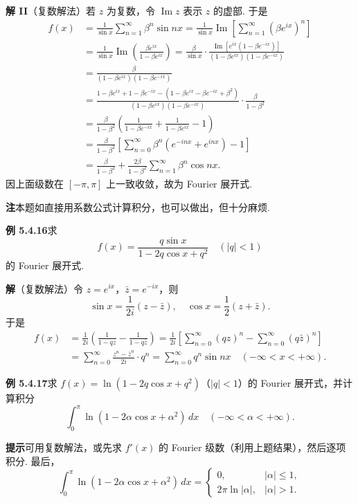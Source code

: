 \documentclass[UTF8, 12pt, fontset=fandol, oneside]{ctexart}
\begin{document}
\noindent\textbf{解 II}\quad （复数解法）若 $z$ 为复数，令 $\operatorname{Im}z$ 表示 $z$ 的虚部. 于是
\[
\begin{aligned}
f(x)&=\frac1{\sin x}\sum_{n=1}^{\infty}\beta^n\sin nx
=\frac1{\sin x}\operatorname{Im}\left[\sum_{n=1}^{\infty}(\beta e^{ix})^n\right]\\
&=\frac1{\sin x}\operatorname{Im}\left(\frac{\beta e^{ix}}{1-\beta e^{ix}}\right)
=\frac{\beta}{\sin x}\cdot
\frac{\operatorname{Im}[e^{ix}(1-\beta e^{-ix})]}
{(1-\beta e^{ix})(1-\beta e^{-ix})}\\
&=\frac{\beta}{(1-\beta e^{ix})(1-\beta e^{-ix})}\\
&=\frac{1-\beta e^{ix}+1-\beta e^{-ix}-(1-\beta e^{ix}-\beta e^{-ix}+\beta^2)}
{(1-\beta e^{ix})(1-\beta e^{-ix})}\cdot\frac{\beta}{1-\beta^2}\\
&=\frac{\beta}{1-\beta^2}\left(\frac1{1-\beta e^{-ix}}+\frac1{1-\beta e^{ix}}-1\right)\\
&=\frac{\beta}{1-\beta^2}\left[\sum_{n=0}^{\infty}\beta^n(e^{-inx}+e^{inx})-1\right]\\
&=\frac{\beta}{1-\beta^2}+\frac{2\beta}{1-\beta^2}\sum_{n=1}^{\infty}\beta^n\cos nx.
\end{aligned}
\]
因上面级数在 $[-\pi,\pi]$ 上一致收敛，故为 Fourier 展开式.

\noindent\textbf{注}\quad 本题如直接用系数公式计算积分，也可以做出，但十分麻烦.

\noindent\textbf{例 5.4.16}\quad 求
\[
  f(x)=\frac{q\sin x}{1-2q\cos x+q^2}\quad(|q|<1)
\]
的 Fourier 展开式.

\noindent\textbf{解}\quad （复数解法）令 $z=e^{ix}$，$\bar z=e^{-ix}$，则
\[
  \sin x=\frac1{2i}(z-\bar z),\quad \cos x=\frac12(z+\bar z).
\]
于是
\[
\begin{aligned}
f(x)&=\frac1{2i}\left(\frac1{1-qz}-\frac1{1-q\bar z}\right)
=\frac1{2i}\left[\sum_{n=0}^{\infty}(qz)^n-\sum_{n=0}^{\infty}(q\bar z)^n\right]\\
&=\sum_{n=0}^{\infty}\frac{z^n-\bar z^n}{2i}\cdot q^n
=\sum_{n=0}^{\infty}q^n\sin nx\quad(-\infty<x<+\infty).
\end{aligned}
\]

\noindent\textbf{例 5.4.17}\quad 求 $f(x)=\ln(1-2q\cos x+q^2)$（$|q|<1$）的 Fourier 展开式，并计算积分
\[
  \int_0^{\pi}\ln(1-2\alpha\cos x+\alpha^2)\,dx\quad(-\infty<\alpha<+\infty).
\]

\noindent\textbf{提示}\quad 可用复数解法，或先求 $f'(x)$ 的 Fourier 级数（利用上题结果），然后逐项积分. 最后，
\[
  \int_0^{\pi}\ln(1-2\alpha\cos x+\alpha^2)\,dx
  =
  \begin{cases}
  0,&|\alpha|\le1,\\
  2\pi\ln|\alpha|,&|\alpha|>1.
  \end{cases}
\]
\end{document}
